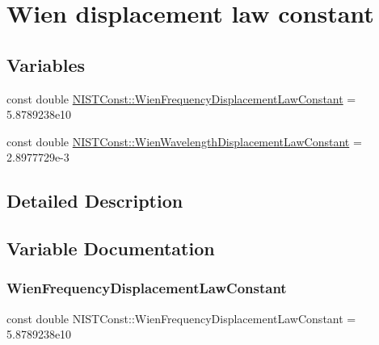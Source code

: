 \hypertarget{group___n_i_s_t_const-_wien_displacement}{}\section{Wien displacement law constant}
\label{group___n_i_s_t_const-_wien_displacement}
\subsection*{Variables}
\begin{DoxyCompactItemize}
\item 
const double \mbox{\hyperlink{group___n_i_s_t_const-_wien_displacement_ga73d0d9fcd8606de359046224389369e8}{N\+I\+S\+T\+Const\+::\+Wien\+Frequency\+Displacement\+Law\+Constant}} = 5.\+8789238e10
\item 
const double \mbox{\hyperlink{group___n_i_s_t_const-_wien_displacement_gadd11261f459797b1750250b9d3ada92a}{N\+I\+S\+T\+Const\+::\+Wien\+Wavelength\+Displacement\+Law\+Constant}} = 2.\+8977729e-\/3
\end{DoxyCompactItemize}


\subsection{Detailed Description}


\subsection{Variable Documentation}
\mbox{\label{group___n_i_s_t_const-_wien_displacement_ga73d0d9fcd8606de359046224389369e8}} 
\subsubsection{\texorpdfstring{Wien\+Frequency\+Displacement\+Law\+Constant}{WienFrequencyDisplacementLawConstant}}
{\footnotesize\ttfamily const double N\+I\+S\+T\+Const\+::\+Wien\+Frequency\+Displacement\+Law\+Constant = 5.\+8789238e10}

